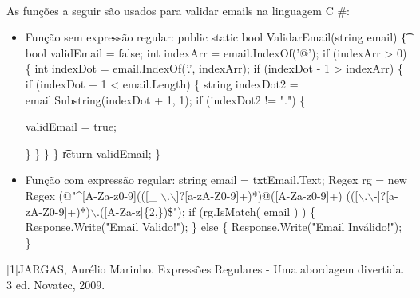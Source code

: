 \documentclass[10pt,a4paper]{article}
\newcommand{\CBarra}{$\backslash$}
\newcommand{\circunflexo}{\textasciicircum}
\begin{document}
\paragraph{}
As funções a seguir são usados para validar emails na linguagem C \#:
\begin{itemize}
\item Função sem expressão regular:\newline
\newline
 public static bool ValidarEmail(string email) \newline
\t \{ \newline
		bool validEmail = false; \newline
		     int indexArr = email.IndexOf('@'); \newline
		     if (indexArr > 0)\newline
		  \{ \newline
			         int indexDot = email.IndexOf('.', indexArr); \newline
			         if (indexDot - 1 > indexArr) \newline
			      \{ \newline
				            if (indexDot + 1 < email.Length) \newline
					         \{ \newline
					            string indexDot2 = email.Substring(indexDot + 1, 1); \newline
					                 if (indexDot2 != ".") \newline
					               \{ \newline

						                  validEmail = true; \newline

					         \} \newline
				      \} \newline
			   \} \newline
		\} \newline
	\t     return validEmail; \newline
\} \newline

\item Função com expressão regular:\newline
string email = txtEmail.Text; \newline
Regex rg = new Regex (@"\circunflexo[A-Za-z0-9](([\_ \CBarra.\CBarra\-]?[a-zA-Z0-9]+)*)@([A-Za-z0-9]+)
(([\CBarra.\CBarra-]?[a-zA-Z0-9]+)*)\CBarra.([A-Za-z]\{2,\})\$");\newline
if (rg.IsMatch( email ) ) \newline
\{\newline
      Response.Write("Email Valido!");\newline
\}\newline
else\newline
\{\newline
      Response.Write("Email Inválido!");\newline
\}\newline

\end{itemize}


\begin{thebibliography}{}
[1]JARGAS, Aurélio Marinho. Expressões Regulares - Uma abordagem divertida. 3 ed. Novatec, 2009.\\

\end{thebibliography}
\end{document}
